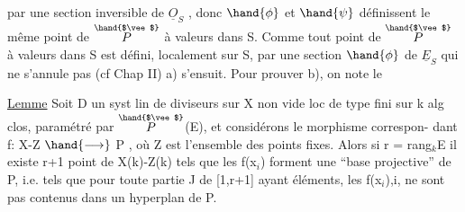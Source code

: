 
par une section inversible de $\underline{O}_S$ , donc $\hand{\phi}$ et $\hand{\psi}$ définissent le même point
de $\overset{\hand{$\vee$}}{P}$ à valeurs dans S. Comme tout point de $\overset{\hand{$\vee$}}{P}$ à valeurs dans S est défini,
localement sur S, par une section $\hand{\phi}$ de $\underline{E}_S$ qui ne s'annule pas (cf Chap II)
a) s'ensuit.   Pour prouver b), on note le

\uline{Lemme}   Soit D un syst lin de diviseurs sur X non vide loc de type fini
sur k alg clos, paramétré par $\overset{\hand{$\vee$}}{P}$(E), et considérons le morphisme correspon-%
dant  f: X-Z $\hand{\longrightarrow}$ P , où Z est l'ensemble des points fixes. Alors  si
r = rang$_k$E  il existe  r+1 point de  X(k)-Z(k)  tels que les
f(x$_i$) forment une  ``base projective'' de P, i.e. tels que  pour toute
partie J de [1,r+1] ayant   éléments,  les  f(x$_i$),i,  ne sont pas
contenus dans un hyperplan de P.

